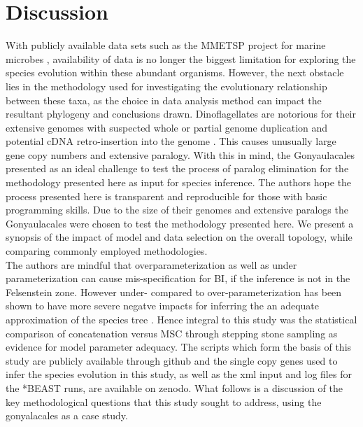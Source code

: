 \documentclass[12pt]{article}
\begin{document}
\newpage
\section{Discussion}
With publicly available data sets such as the MMETSP project for marine microbes \cite{keeling2014marine}, availability of data is no longer the biggest limitation for exploring the species evolution within these abundant organisms. 
However, the next obstacle lies in the methodology used for investigating the evolutionary relationship between these taxa, as the choice in data analysis method can impact the resultant phylogeny and conclusions drawn. 
Dinoflagellates are notorious for their extensive genomes with suspected whole or partial genome duplication and potential cDNA retro-insertion into the genome \cite{van2009florida.beauchemin2012dinoflagellate,slamovits2008widespread,hou2009distinct,lin2011genomic}. 
This causes unusually large gene copy numbers and extensive paralogy. 
With this in mind, the Gonyaulacales presented as an ideal challenge to test the process of paralog elimination for the methodology presented here as input for species inference.  
The authors hope the process presented here is transparent and reproducible for those with basic programming skills. 
Due to the size of their genomes and extensive paralogs the Gonyaulacales were chosen to test the methodology presented here.
We present a synopsis of the impact of model and data selection on the overall topology, while comparing commonly employed methodologies. \\
The authors are mindful that overparameterization as well as under parameterization can cause mis-specification for BI, if the inference is not in the Felsenstein zone. 
However under- compared to over-parameterization has been shown to have  more severe negatve impacts for inferring the an adequate approximation of the species tree \cite{lemmon2004importance}. 
Hence integral to this study was the statistical comparison of concatenation versus MSC through stepping stone sampling as evidence for model parameter adequacy. 
The scripts which form the basis of this study are publicly available through github and the single copy genes used to infer the species evolution in this study, as well as the xml input and log files for the *BEAST runs, are available on zenodo. 
What follows is a discussion of the key methodological questions that this study sought to address, using the gonyalacales as a case study. 
\end{document}
